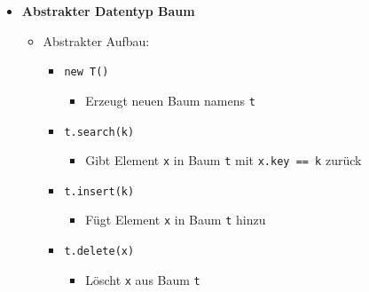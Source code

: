 \begin{itemize}
                \pagebreak

            \item \textbf{Abstrakter Datentyp Baum}
                \begin{itemize}
                    \item Abstrakter Aufbau:
                        \begin{itemize}
                            \item \texttt{new T()}
                                \begin{itemize}
                                    \item Erzeugt neuen Baum namens \texttt{t}
                                \end{itemize}

                            \item \texttt{t.search(k)}
                                \begin{itemize}
                                    \item Gibt Element \texttt{x} in Baum \texttt{t} mit \texttt{x.key == k} zurück
                                \end{itemize}
                            
                            \item \texttt{t.insert(k)}
                                \begin{itemize}
                                    \item Fügt Element \texttt{x} in Baum \texttt{t} hinzu
                                \end{itemize}
                            
                            \item \texttt{t.delete(x)}
                                \begin{itemize}
                                    \item Löscht \texttt{x} aus Baum \texttt{t}
                                \end{itemize}
                        \end{itemize}


\end{itemize}
\end{itemize}
